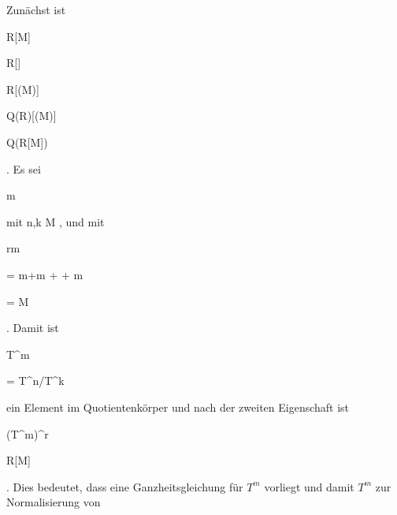 {


Zunächst ist


\mavergleichskettedisp

{\vergleichskette

{ R[M]
}

{ \subseteq} {R[]
}

{ \subseteq} {R[\Gamma(M)]
}

{ \subseteq} {Q(R)[\Gamma(M)]
}

{ \subseteq} {Q(R[M])
}

}
{}{}{.}
Es sei


\mavergleichskette

{\vergleichskette

{ m
}

{ \in }{ 
}

{  }{
}

{    }{
}

{   }{
}

}
{}{}{}
mit  { n,k \in M   }{,} und mit


\mavergleichskette

{\vergleichskette

{ rm
}

{ = }{ m+m + \cdots + m
}

{ = }{ M
}

{    }{
}

{   }{
}

}
{}{}{}
 {} {.}
Damit ist


\mavergleichskette

{\vergleichskette

{ T^m
}

{ = }{ T^n/T^k
}

{  }{
}

{    }{
}

{   }{
}

}
{}{}{}
ein Element im Quotientenkörper und nach der zweiten Eigenschaft ist


\mavergleichskette

{\vergleichskette

{ (T^m)^r
}

{ \in }{ R[M]
}

{  }{
}

{    }{
}

{   }{
}

}
{}{}{.}
Dies bedeutet, dass eine
 {} {}
Ganzheitsgleichung für $T^m$ vorliegt und damit $T^m$ zur Normalisierung von

}
